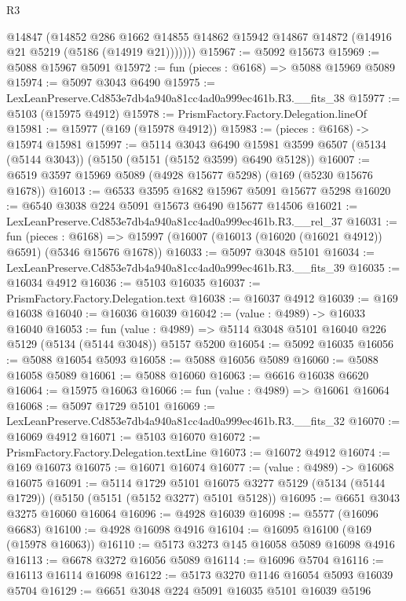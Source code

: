 \begin{lexlean}{R3}
\begin{coremodule}
          @14847
          (@14852
            @286
            @1662
            @14855
            @14862
            @15942
            @14867
            @14872
            (@14916 @21 @5219 (@5186 (@14919 @21)))))))
@15967 := @5092 @15673
@15969 := @5088 @15967 @5091
@15972 := fun (pieces : @6168) => @5088 @15969 @5089
@15974 := @5097 @3043 @6490
@15975 := LexLeanPreserve.Cd853e7db4a940a81cc4ad0a999ec461b.R3.__fits_38
@15977 := @5103 (@15975 @4912)
@15978 := PrismFactory.Factory.Delegation.lineOf
@15981 := @15977 (@169 (@15978 @4912))
@15983 := (pieces : @6168) -> @15974 @15981
@15997 := @5114
    @3043
    @6490
    @15981
    @3599
    @6507
    (@5134 (@5144 @3043))
    (@5150 (@5151 (@5152 @3599) @6490 @5128))
@16007 := @6519 @3597 @15969 @5089 (@4928 @15677 @5298) (@169 (@5230 @15676 @1678))
@16013 := @6533 @3595 @1682 @15967 @5091 @15677 @5298
@16020 := @6540 @3038 @224 @5091 @15673 @6490 @15677 @14506
@16021 := LexLeanPreserve.Cd853e7db4a940a81cc4ad0a999ec461b.R3.__rel_37
@16031 := fun (pieces : @6168) =>
  @15997 (@16007 (@16013 (@16020 (@16021 @4912)) @6591) (@5346 @15676 @1678))
@16033 := @5097 @3048 @5101
@16034 := LexLeanPreserve.Cd853e7db4a940a81cc4ad0a999ec461b.R3.__fits_39
@16035 := @16034 @4912
@16036 := @5103 @16035
@16037 := PrismFactory.Factory.Delegation.text
@16038 := @16037 @4912
@16039 := @169 @16038
@16040 := @16036 @16039
@16042 := (value : @4989) -> @16033 @16040
@16053 := fun (value : @4989) =>
  @5114 @3048 @5101 @16040 @226 @5129 (@5134 (@5144 @3048)) @5157 @5200
@16054 := @5092 @16035
@16056 := @5088 @16054 @5093
@16058 := @5088 @16056 @5089
@16060 := @5088 @16058 @5089
@16061 := @5088 @16060
@16063 := @6616 @16038 @6620
@16064 := @15975 @16063
@16066 := fun (value : @4989) => @16061 @16064
@16068 := @5097 @1729 @5101
@16069 := LexLeanPreserve.Cd853e7db4a940a81cc4ad0a999ec461b.R3.__fits_32
@16070 := @16069 @4912
@16071 := @5103 @16070
@16072 := PrismFactory.Factory.Delegation.textLine
@16073 := @16072 @4912
@16074 := @169 @16073
@16075 := @16071 @16074
@16077 := (value : @4989) -> @16068 @16075
@16091 := @5114
    @1729
    @5101
    @16075
    @3277
    @5129
    (@5134 (@5144 @1729))
    (@5150 (@5151 (@5152 @3277) @5101 @5128))
@16095 := @6651 @3043 @3275 @16060 @16064
@16096 := @4928 @16039
@16098 := @5577 (@16096 @6683)
@16100 := @4928 @16098 @4916
@16104 := @16095 @16100 (@169 (@15978 @16063))
@16110 := @5173 @3273 @145 @16058 @5089 @16098 @4916
@16113 := @6678 @3272 @16056 @5089
@16114 := @16096 @5704
@16116 := @16113 @16114 @16098
@16122 := @5173 @3270 @1146 @16054 @5093 @16039 @5704
@16129 := @6651 @3048 @224 @5091 @16035 @5101 @16039 @5196

\end{coremodule}
\end{lexlean}
